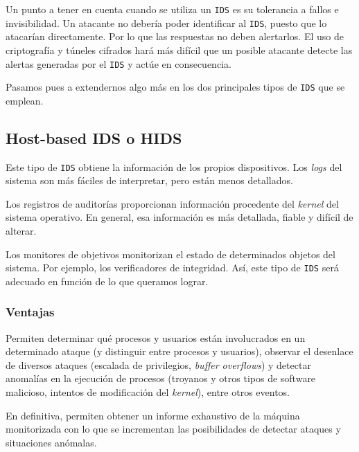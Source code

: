 \documentclass[12pt]{article}
\newcommand{\newpar} {
    \vskip 0.5cm
}
\begin{document}
                \newpar

                Un punto a tener en cuenta cuando se utiliza un \texttt{IDS} es su tolerancia a fallos e invisibilidad. Un atacante no debería poder identificar al \texttt{IDS}, puesto que lo atacarían directamente. Por lo que las respuestas no deben alertarlos. El uso de criptografía y túneles cifrados hará más difícil que un posible atacante detecte las alertas generadas por el \texttt{IDS} y actúe en consecuencia.

                \newpar

                Pasamos pues a extendernos algo más en los dos principales tipos de \texttt{IDS} que se emplean.

        \subsection{Host-based IDS o HIDS}
            Este tipo de \texttt{IDS} obtiene la información de los propios dispositivos. Los \textit{logs} del sistema son más fáciles de interpretar, pero están menos detallados.

            \newpar

            Los registros de auditorías proporcionan información procedente del \textit{kernel} del sistema operativo. En general, esa información es más detallada, fiable y difícil de alterar.

            \newpar

            Los monitores de objetivos monitorizan el estado de determinados objetos del sistema. Por ejemplo, los verificadores de integridad. Así, este tipo de \texttt{IDS} será adecuado en función de lo que queramos lograr.

            \subsubsection{Ventajas}
                Permiten determinar qué procesos y usuarios están involucrados en un determinado ataque (y distinguir entre procesos y usuarios), observar el desenlace de diversos ataques (escalada de privilegios, \textit{buffer overflows}) y detectar anomalías en la ejecución de procesos (troyanos y otros tipos de software malicioso, intentos de modificación del \textit{kernel}), entre otros eventos.

                \newpar

                En definitiva, permiten obtener un informe exhaustivo de la máquina monitorizada con lo que se incrementan las posibilidades de detectar ataques y situaciones anómalas.
\end{document}
